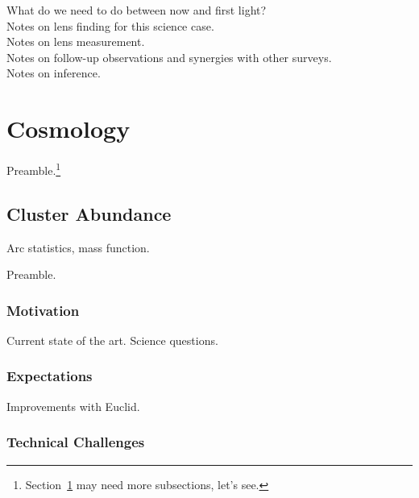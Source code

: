 \documentclass[twocolumn]{svjour3}
\begin{document}
What do we need to do between now and first light?\\

Notes on lens finding for this science case.\\

Notes on lens measurement.\\

Notes on follow-up observations and synergies with other surveys.\\

Notes on inference.\\



\section{Cosmology}
\label{sec:cosmology}



Preamble.\footnote{Section~\ref{sec:cosmology} may need more subsections, let's see.}


\subsection{Cluster Abundance}



Arc statistics, mass function.

Preamble.

\subsubsection{Motivation}
Current state of the art. Science questions.\\

\subsubsection{Expectations}
Improvements with Euclid.\\

\subsubsection{Technical Challenges}
\end{document}
